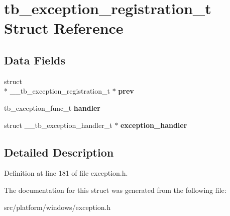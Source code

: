 \hypertarget{structtb__exception__registration__t}{\section{tb\-\_\-exception\-\_\-registration\-\_\-t Struct Reference}
\label{structtb__exception__registration__t}
}
\subsection*{Data Fields}
\begin{DoxyCompactItemize}
\item 
\hypertarget{structtb__exception__registration__t_a99029ae0371264325490d8c4300af764}{struct \\*
\-\_\-\-\_\-tb\-\_\-exception\-\_\-registration\-\_\-t $\ast$ {\bfseries prev}}\label{structtb__exception__registration__t_a99029ae0371264325490d8c4300af764}

\item 
\hypertarget{structtb__exception__registration__t_a602f24b61269868aacc864ceaa509539}{tb\-\_\-exception\-\_\-func\-\_\-t {\bfseries handler}}\label{structtb__exception__registration__t_a602f24b61269868aacc864ceaa509539}

\item 
\hypertarget{structtb__exception__registration__t_a5315b4048fd5f1589563b3c2e94f16a5}{struct \-\_\-\-\_\-tb\-\_\-exception\-\_\-handler\-\_\-t $\ast$ {\bfseries exception\-\_\-handler}}\label{structtb__exception__registration__t_a5315b4048fd5f1589563b3c2e94f16a5}

\end{DoxyCompactItemize}


\subsection{Detailed Description}


Definition at line 181 of file exception.\-h.



The documentation for this struct was generated from the following file\-:\begin{DoxyCompactItemize}
\item 
src/platform/windows/exception.\-h\end{DoxyCompactItemize}
